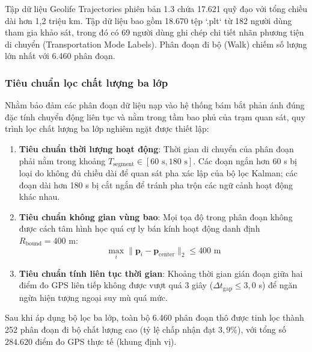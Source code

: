 \hspace{0.5cm} Tập dữ liệu Geolife Trajectories phiên bản 1.3 chứa 17.621 quỹ đạo với tổng chiều dài hơn 1,2 triệu km. Tập dữ liệu bao gồm 18.670 tệp `.plt` từ 182 người dùng tham gia khảo sát, trong đó có 69 người dùng ghi chép chi tiết nhãn phương tiện di chuyển (Transportation Mode Labels). Phân đoạn đi bộ (Walk) chiếm số lượng lớn nhất với 6.460 phân đoạn.

\subsubsection{Tiêu chuẩn lọc chất lượng ba lớp}

\hspace{0.5cm} Nhằm bảo đảm các phân đoạn dữ liệu nạp vào hệ thống bám bắt phản ánh đúng đặc tính chuyển động liên tục và nằm trong tầm bao phủ của trạm quan sát, quy trình lọc chất lượng ba lớp nghiêm ngặt được thiết lập:
\begin{enumerate}
    \item \textbf{Tiêu chuẩn thời lượng hoạt động}: Thời gian di chuyển của phân đoạn phải nằm trong khoảng $T_{\text{segment}} \in [60\text{ s}, 180\text{ s}]$. Các đoạn ngắn hơn 60 s bị loại do không đủ chiều dài để quan sát pha xác lập của bộ lọc Kalman; các đoạn dài hơn 180 s bị cắt ngắn để tránh pha trộn các ngữ cảnh hoạt động khác nhau.
    \item \textbf{Tiêu chuẩn không gian vùng bao}: Mọi tọa độ trong phân đoạn không được cách tâm hình học quá cự ly bán kính hoạt động danh định $R_{\text{bound}} = 400$ m:
    \begin{equation}
    \max_{i} \|\mathbf{p}_i - \mathbf{p}_{\text{center}}\|_2 \le 400 \text{ m}
    \label{eq:geolife-spatial-bound}
    \end{equation}
    \item \textbf{Tiêu chuẩn tính liên tục thời gian}: Khoảng thời gian gián đoạn giữa hai điểm đo GPS liên tiếp không được vượt quá 3 giây ($\Delta t_{\text{gap}} \le 3{,}0$ s) để ngăn ngừa hiện tượng ngoại suy mù quá mức.
\end{enumerate}

Sau khi áp dụng bộ lọc ba lớp, toàn bộ 6.460 phân đoạn thô được tinh lọc thành 252 phân đoạn đi bộ chất lượng cao (tỷ lệ chấp nhận đạt $3{,}9\%$), với tổng số $284.620$ điểm đo GPS thực tế (khung định vị).

